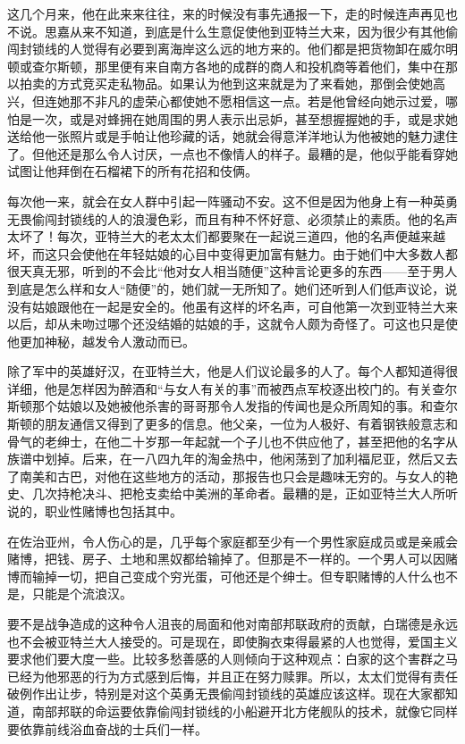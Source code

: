 \par 这几个月来，他在此来来往往，来的时候没有事先通报一下，走的时候连声再见也不说。思嘉从来不知道，到底是什么生意促使他到亚特兰大来，因为很少有其他偷闯封锁线的人觉得有必要到离海岸这么远的地方来的。他们都是把货物卸在威尔明顿或查尔斯顿，那里便有来自南方各地的成群的商人和投机商等着他们，集中在那以拍卖的方式竞买走私物品。如果认为他到这来就是为了来看她，那倒会使她高兴，但连她那不非凡的虚荣心都使她不愿相信这一点。若是他曾经向她示过爱，哪怕是一次，或是对蜂拥在她周围的男人表示出忌妒，甚至想握握她的手，或是求她送给他一张照片或是手帕让他珍藏的话，她就会得意洋洋地认为他被她的魅力逮住了。但他还是那么令人讨厌，一点也不像情人的样子。最糟的是，他似乎能看穿她试图让他拜倒在石榴裙下的所有花招和伎俩。
\par 每次他一来，就会在女人群中引起一阵骚动不安。这不但是因为他身上有一种英勇无畏偷闯封锁线的人的浪漫色彩，而且有种不怀好意、必须禁止的素质。他的名声太坏了！每次，亚特兰大的老太太们都要聚在一起说三道四，他的名声便越来越坏，而这只会使他在年轻姑娘的心目中变得更加富有魅力。由于她们中大多数人都很天真无邪，听到的不会比“他对女人相当随便”这种言论更多的东西——至于男人到底是怎么样和女人“随便”的，她们就一无所知了。她们还听到人们低声议论，说没有姑娘跟他在一起是安全的。他虽有这样的坏名声，可自他第一次到亚特兰大来以后，却从未吻过哪个还没结婚的姑娘的手，这就令人颇为奇怪了。可这也只是使他更加神秘，越发令人激动而已。
\par 除了军中的英雄好汉，在亚特兰大，他是人们议论最多的人了。每个人都知道得很详细，他是怎样因为醉酒和“与女人有关的事”而被西点军校逐出校门的。有关查尔斯顿那个姑娘以及她被他杀害的哥哥那令人发指的传闻也是众所周知的事。和查尔斯顿的朋友通信又得到了更多的信息。他父亲，一位为人极好、有着钢铁般意志和骨气的老绅士，在他二十岁那一年起就一个子儿也不供应他了，甚至把他的名字从族谱中划掉。后来，在一八四九年的淘金热中，他闲荡到了加利福尼亚，然后又去了南美和古巴，对他在这些地方的活动，那报告也只会是趣味无穷的。与女人的艳史、几次持枪决斗、把枪支卖给中美洲的革命者。最糟的是，正如亚特兰大人所听说的，职业性赌博也包括其中。
\par 在佐治亚州，令人伤心的是，几乎每个家庭都至少有一个男性家庭成员或是亲戚会赌博，把钱、房子、土地和黑奴都给输掉了。但那是不一样的。一个男人可以因赌博而输掉一切，把自己变成个穷光蛋，可他还是个绅士。但专职赌博的人什么也不是，只能是个流浪汉。
\par 要不是战争造成的这种令人沮丧的局面和他对南部邦联政府的贡献，白瑞德是永远也不会被亚特兰大人接受的。可是现在，即使胸衣束得最紧的人也觉得，爱国主义要求他们要大度一些。比较多愁善感的人则倾向于这种观点：白家的这个害群之马已经为他邪恶的行为方式感到后悔，并且正在努力赎罪。所以，太太们觉得有责任破例作出让步，特别是对这个英勇无畏偷闯封锁线的英雄应该这样。现在大家都知道，南部邦联的命运要依靠偷闯封锁线的小船避开北方佬舰队的技术，就像它同样要依靠前线浴血奋战的士兵们一样。
